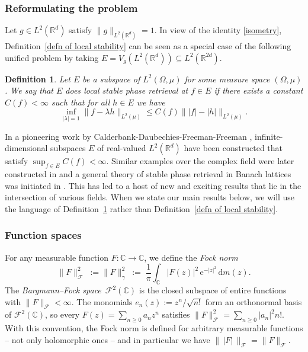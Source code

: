 \documentclass[11pt]{amsart}
\newtheorem{definition}[theorem]{Definition}
\theoremstyle{remark}
\begin{document}
\subsubsection{Reformulating the problem}
Let $g\in L^2(\mathbb{R}^d)$ satisfy $\|g\|_{ L^2(\mathbb{R}^d)}=1$. In view of the identity \eqref{isometry}, Definition~\ref{defn of local stability} can be seen as a special case of the following unified problem by taking $E=V_g(L^2(\mathbb{R}^{d}))\subseteq L^2(\mathbb{R}^{2d})$.

\begin{definition}\label{defn of local stability2}
    Let $E$ be a subspace of $L^2(\Omega,\mu)$ for some measure space $(\Omega,\mu)$. We say that $E$ does \emph{local stable phase retrieval at $f\in E$} if there exists a constant $C(f)<\infty$ such that for all $h\in E$ we have
    \begin{equation*}
        \inf_{|\lambda|=1}\|f-\lambda h\|_{L^2(\mu)}\leq C(f) \| |f|-|h|\|_{L^2(\mu)}.
    \end{equation*}
\end{definition}
In a pioneering work by Calderbank-Daubechies-Freeman-Freeman \cite{calderbank2022stable}, infinite-dimensional subspaces $E$ of real-valued $L^2(\mathbb{R}^d)$ have been constructed that satisfy $\sup_{f\in E}C(f)<\infty$. Similar examples over the complex field were later constructed in \cite{MR4837558} and a general theory of stable phase retrieval in Banach lattices was initiated in \cite{MR4800909}. This has led to a host of new and exciting results \cite{camunez2025characterization,garcia2025isometric,garcia2025existence} that lie in the intersection of various fields. When we state our main results below, we will use the language of Definition~\ref{defn of local stability2} rather than Definition~\ref{defn of local stability}.

\subsubsection{Function spaces} \label{Sec:Fun}

For any measurable function $F \colon \mathbb{C} \to \mathbb{C}$, we define the
\emph{Fock norm}
\[
\lVert F \rVert_{\mathcal{F}}^2
\;:=\lVert F \rVert_{\gamma}^2
\;:=\;
\frac{1}{\pi}\int_{\mathbb{C}} \lvert F(z) \rvert^2 \, \mathrm{e}^{-\lvert z \rvert^2}\,\mathrm{d} m(z).
\]
The \emph{Bargmann--Fock space}~$\mathcal{F}^2(\mathbb{C})$ is the closed subspace of entire functions with
$\lVert F \rVert_{\mathcal{F}} < \infty$.
The monomials $e_n(z) := z^n/\sqrt{n!}$ form an orthonormal basis of $\mathcal{F}^2(\mathbb{C})$, so every
$F(z) = \sum_{n \ge 0} a_n z^n$ satisfies
$\lVert F \rVert_{\mathcal{F}}^2 = \sum_{n \ge 0} \lvert a_n \rvert^2 n!$.
With this convention, the Fock norm is defined for arbitrary measurable
functions --  not only holomorphic ones -- and in particular we have
$\lVert \,\lvert F \rvert\, \rVert_{\mathcal{F}} = \lVert F \rVert_{\mathcal{F}}$.
\medskip
\end{document}
